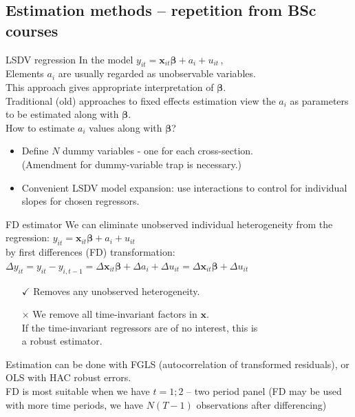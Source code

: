 \documentclass[usenames,dvipsnames]{beamer}
\begin{document}
\subsection*{Estimation methods -- repetition from BSc courses}
\begin{frame}{LSDV regression}
In the model \quad  $y_{it} = \bm{x}_{it} \bm{\beta} + a_i + u_{it} \,$, \\
\bigskip
Elements $a_i$ are usually regarded as unobservable variables. \\
This approach gives appropriate interpretation of $\bm{\beta}$. \\
Traditional (old) approaches to fixed effects estimation view the $a_i$ as parameters to be estimated along with $\bm{\beta}$. \\
\bigskip
How to estimate $a_i$ values along with $\bm{\beta}$?\\
\medskip
\begin{itemize}
\item Define $N$ dummy variables - one for each cross-section. \\
(Amendment for dummy-variable trap is necessary.)
\smallskip
\item Convenient LSDV model expansion: use interactions to control for individual slopes for chosen regressors.
\end{itemize}
\end{frame}
\begin{frame}{FD estimator}
We can eliminate unobserved individual heterogeneity from the regression: \quad $y_{it} = \bm{x}_{it} \bm{\beta} + a_i + u_{it}$ \\ \smallskip
by first differences (FD) transformation: \\
$\Delta y_{it} = y_{it} - y_{i,t-1} = \Delta \bm{x}_{it} \bm{\beta} + \Delta a_i + \Delta u_{it} = \Delta \bm{x}_{it} \bm{\beta} + \Delta u_{it}$ \\ \medskip
\begin{itemize}
\item[$\checkmark$] Removes any unobserved heterogeneity.
\item[$\times$] We remove all time-invariant factors in $\bm{x}$.\\
If the time-invariant regressors are of no interest, this is \\a robust estimator.
\end{itemize} \medskip
Estimation can be done with FGLS (autocorrelation of transformed residuals), or OLS with HAC robust errors. \\
\medskip
FD is most suitable when we have $t = 1; 2$ – two period panel (FD may be used with more time periods, we have $N(T-1)$ observations after differencing)
\end{frame}
\end{document}
